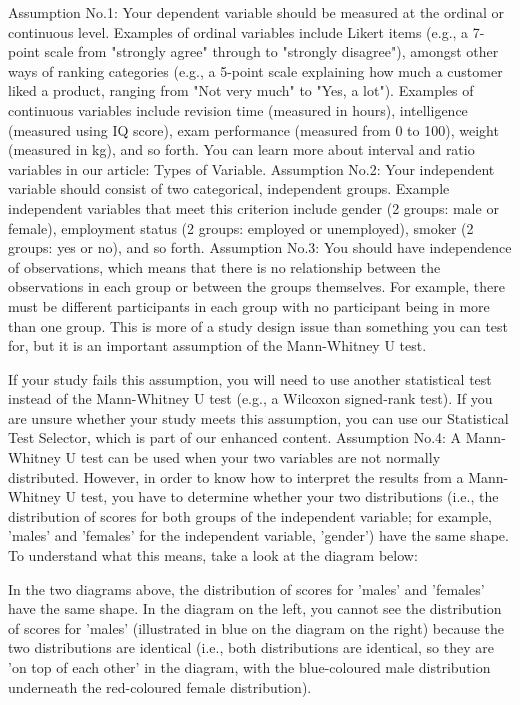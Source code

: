 \documentclass[]{article}
\begin{document}
Assumption No.1: Your dependent variable should be measured at the ordinal or continuous level. Examples of ordinal variables include Likert items (e.g., a 7-point scale from "strongly agree" through to "strongly disagree"), amongst other ways of ranking categories (e.g., a 5-point scale explaining how much a customer liked a product, ranging from "Not very much" to "Yes, a lot"). Examples of continuous variables include revision time (measured in hours), intelligence (measured using IQ score), exam performance (measured from 0 to 100), weight (measured in kg), and so forth. You can learn more about interval and ratio variables in our article: Types of Variable.
Assumption No.2: Your independent variable should consist of two categorical, independent groups. Example independent variables that meet this criterion include gender (2 groups: male or female), employment status (2 groups: employed or unemployed), smoker (2 groups: yes or no), and so forth.
Assumption No.3: You should have independence of observations, which means that there is no relationship between the observations in each group or between the groups themselves. For example, there must be different participants in each group with no participant being in more than one group. This is more of a study design issue than something you can test for, but it is an important assumption of the Mann-Whitney U test. 


If your study fails this assumption, you will need to use another statistical test instead of the Mann-Whitney U test (e.g., a Wilcoxon signed-rank test). If you are unsure whether your study meets this assumption, you can use our Statistical Test Selector, which is part of our enhanced content.
Assumption No.4: A Mann-Whitney U test can be used when your two variables are not normally distributed. However, in order to know how to interpret the results from a Mann-Whitney U test, you have to determine whether your two distributions (i.e., the distribution of scores for both groups of the independent variable; for example, 'males' and 'females' for the independent variable, 'gender') have the same shape. To understand what this means, take a look at the diagram below:


In the two diagrams above, the distribution of scores for 'males' and 'females' have the same shape. In the diagram on the left, you cannot see the distribution of scores for 'males' (illustrated in blue on the diagram on the right) because the two distributions are identical (i.e., both distributions are identical, so they are 'on top of each other' in the diagram, with the blue-coloured male distribution underneath the red-coloured female distribution). 
\end{document}
